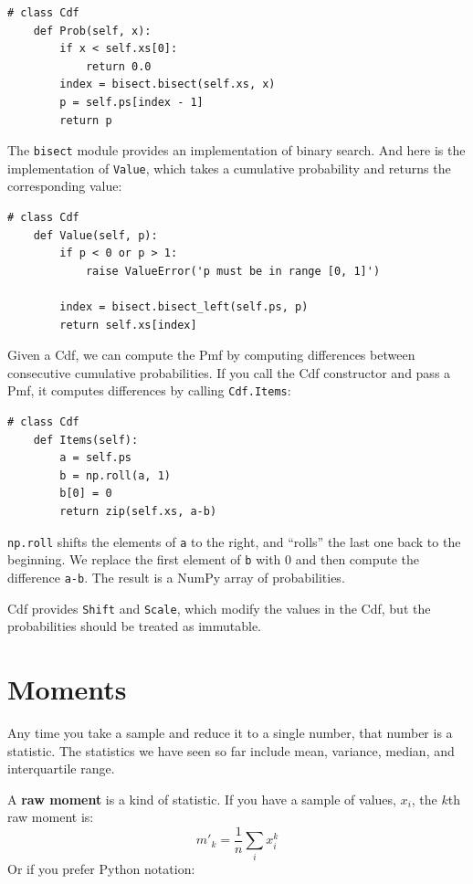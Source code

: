 \documentclass[12pt]{book}
\begin{document}
\begin{verbatim}
# class Cdf
    def Prob(self, x):
        if x < self.xs[0]:
            return 0.0
        index = bisect.bisect(self.xs, x)
        p = self.ps[index - 1]
        return p
\end{verbatim}

The \verb"bisect" module provides an implementation of binary search.
And here is the implementation of \verb"Value", which takes a
cumulative probability and returns the corresponding value:

\begin{verbatim}
# class Cdf
    def Value(self, p):
        if p < 0 or p > 1:
            raise ValueError('p must be in range [0, 1]')

        index = bisect.bisect_left(self.ps, p)
        return self.xs[index]
\end{verbatim}

Given a Cdf, we can compute the Pmf by computing differences between
consecutive cumulative probabilities.  If you call the Cdf constructor
and pass a Pmf, it computes differences by calling \verb"Cdf.Items":

\begin{verbatim}
# class Cdf
    def Items(self):
        a = self.ps
        b = np.roll(a, 1)
        b[0] = 0
        return zip(self.xs, a-b)
\end{verbatim}

\verb"np.roll" shifts the elements of \verb"a" to the right, and ``rolls''
the last one back to the beginning.  We replace the first element of
\verb"b" with 0 and then compute the difference \verb"a-b".  The result
is a NumPy array of probabilities.

Cdf provides \verb"Shift" and \verb"Scale", which modify the
values in the Cdf, but the probabilities should be treated as
immutable.


\section{Moments}

Any time you take a sample and reduce it to a single number, that
number is a statistic.  The statistics we have seen so far include
mean, variance, median, and interquartile range.

A {\bf raw moment} is a kind of statistic.  If you have a sample of
values, $x_i$, the $k$th raw moment is:
%
\[ m'_k = \frac{1}{n} \sum_i x_i^k \]
%
Or if you prefer Python notation:
\end{document}

